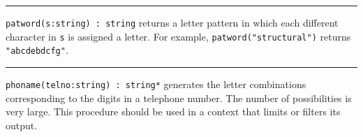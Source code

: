 








\vspace{0.25cm}\hrule{}

\texttt{patword(s:string) : string} returns a letter pattern in which
each different character in \texttt{s} is assigned a letter. For
example, \texttt{patword("structural")}
returns \texttt{"abcdebdcfg"}.

\vspace{0.25cm}\hrule{}

\texttt{phoname(telno:string) : string*} generates the letter
combinations corresponding to the digits in a telephone number. The
number of possibilities is very large. This procedure should be used in
a context that limits or filters its output.

